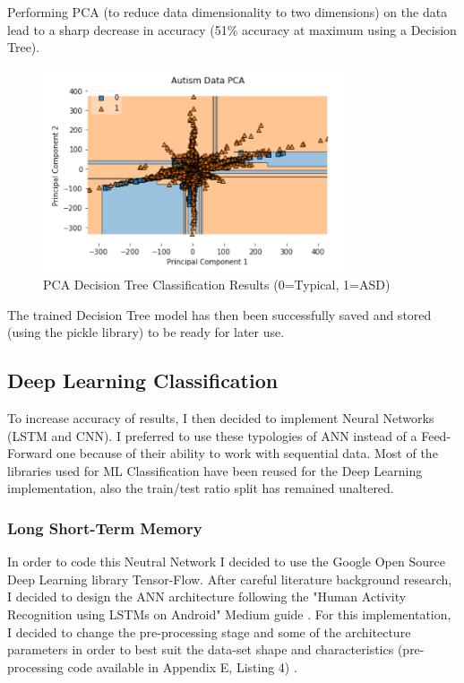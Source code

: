 

% 


Performing PCA (to reduce data dimensionality to two dimensions) on the data lead to a sharp decrease in accuracy (51\% accuracy at maximum using a Decision Tree).

\begin{figure}[ht!]%
    \centering
    \includegraphics[width=9cm]{images/mlpca.PNG}%
    \caption{PCA Decision Tree Classification Results (0=Typical, 1=ASD)}
\end{figure}

The trained Decision Tree model has then been successfully saved and stored (using the pickle library) to be ready for later use.

\subsection{Deep Learning Classification}
To increase accuracy of results, I then decided to implement Neural Networks (LSTM and CNN). I preferred to use these typologies of ANN instead of a Feed-Forward one because of their ability to work with sequential data. Most of the libraries used for ML Classification have been reused for the Deep Learning implementation, also the train/test ratio split has remained unaltered.

\subsubsection{Long Short-Term Memory}
In order to code this Neutral Network I decided to use the Google Open Source Deep Learning library Tensor-Flow. After careful literature background research, I decided to design the ANN architecture following the "Human Activity Recognition using LSTMs on Android" Medium guide \cite{android}. For this implementation, I decided to change the pre-processing stage and some of the architecture parameters in order to best suit the data-set shape and characteristics (pre-processing code available in Appendix E, Listing 4) . 

